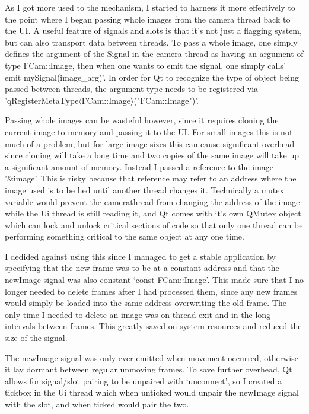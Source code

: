 \documentclass[11pt]{article} %
\begin{document}
As I got more used to the mechanism, I started to harness it more effectively to the point where I began passing whole images from the camera thread back to the UI. A useful feature of signals and slots is that it's not just a flagging system, but can also transport data between threads.  To pass a whole image, one simply defines the argument of the Signal in the camera thread as having an argument of type FCam::Image, then when one wants to emit the signal, one simply calls' emit mySignal(image\_arg)'. In order for Qt to recognize the type of object being passed between threads, the argument type needs to be registered via 'qRegisterMetaType\(\langle\)FCam::Image\(\rangle\)("FCam::Image")'.

Passing whole images can be wasteful however, since it requires cloning the current image to memory and passing it to the UI. For small images this is not much of a problem, but for large image sizes this can cause significant overhead since cloning will take a long time and two copies of the same image will take up a significant amount of memory. Instead I passed a reference to the image '\&image'. This is risky because that reference may refer to an address where the image used is to be hed until another thread changes it. Technically a mutex variable would prevent the camerathread from changing the address of the image while the Ui thread is still reading it, and Qt comes with it’s own QMutex object which can lock and unlock critical sections of code so that only one thread can be performing something critical to the same object at any one time.

I dedided against using this since I managed to get a stable application by specifying that the new frame was to be at a constant address and that the newImage signal was also constant ‘const FCam::Image’. This made sure that I no longer needed to delete frames after I had processed them, since any new frames would simply be loaded into the same address overwriting the old frame. The only time I needed to delete an image was on thread exit and in the long intervals between frames. This greatly saved on system resources and reduced the size of the signal.

The newImage signal was only ever emitted when movement occurred, otherwise it lay dormant between regular unmoving frames.
To save further overhead, Qt allows for signal/slot pairing to be unpaired with ‘unconnect’, so I created a tickbox in the Ui thread which when unticked would unpair the newImage signal with the slot, and when ticked would pair the two.
\end{document}
